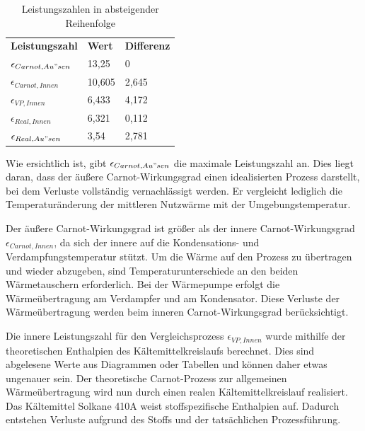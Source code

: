 \begin{table}[!ht]
    \centering
    \caption{Leistungszahlen in absteigender Reihenfolge}
    \label{tab:Leistungszahlen}
    \begin{tabular}{|l|l|l|}
        \hline
    \rowcolor[HTML]{70AD47} 
    {\color[HTML]{333333} \textbf{Leistungszahl}}  & {\color[HTML]{333333} \textbf{Wert}} & {\color[HTML]{333333} \textbf{Differenz}} \\
    \rowcolor[HTML]{C6E0B4} 
    $\epsilon_{Carnot,Au"sen}$ & 13,25                                & 0                                         \\ \hline
    \rowcolor[HTML]{E2EFDA} 
    $\epsilon_{Carnot,Innen}$  & 10,605                               & 2,645                                     \\ \hline
    \rowcolor[HTML]{C6E0B4} 
    $\epsilon_{VP,Innen}$      & 6,433                                & 4,172                                     \\ \hline
    \rowcolor[HTML]{E2EFDA} 
    $\epsilon_{Real,Innen}$    & 6,321                                & 0,112                                     \\ \hline
    \rowcolor[HTML]{C6E0B4} 
    $\epsilon_{Real,Au"sen}$   & 3,54                                 & 2,781                                     \\ \hline
    \end{tabular}%
    \end{table}

Wie ersichtlich ist, gibt $\epsilon_{Carnot,Au"sen}$ die maximale Leistungszahl an. 
Dies liegt daran, dass der äußere Carnot-Wirkungsgrad einen idealisierten Prozess darstellt, bei dem Verluste vollständig vernachlässigt werden. 
Er vergleicht lediglich die Temperaturänderung der mittleren Nutzwärme mit der Umgebungstemperatur.

Der äußere Carnot-Wirkungsgrad ist größer als der innere Carnot-Wirkungsgrad $\epsilon_{Carnot,Innen}$, da sich der innere auf die Kondensations- und Verdampfungstemperatur stützt. 
Um die Wärme auf den Prozess zu übertragen und wieder abzugeben, sind Temperaturunterschiede an den beiden Wärmetauschern erforderlich. 
Bei der Wärmepumpe erfolgt die Wärmeübertragung am Verdampfer und am Kondensator. 
Diese Verluste der Wärmeübertragung werden beim inneren Carnot-Wirkungsgrad berücksichtigt.

Die innere Leistungszahl für den Vergleichsprozess $\epsilon_{VP,Innen}$ wurde mithilfe der theoretischen Enthalpien des Kältemittelkreislaufs berechnet.
Dies sind abgelesene Werte aus Diagrammen oder Tabellen und können daher etwas ungenauer sein. 
Der theoretische Carnot-Prozess zur allgemeinen Wärmeübertragung wird nun durch einen realen Kältemittelkreislauf realisiert. 
Das Kältemittel Solkane 410A weist stoffspezifische Enthalpien auf. 
Dadurch entstehen Verluste aufgrund des Stoffs und der tatsächlichen Prozessführung.

